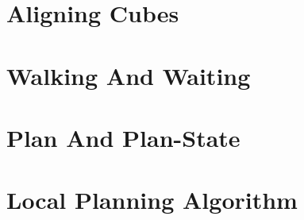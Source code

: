 \section{Aligning Cubes}
\label{sec:align}



\section{Walking And Waiting}
\label{sec:walk_wait}



\section{Plan And Plan-State}
\label{sec:plan}



\section{Local Planning Algorithm}
\label{sec:local_algo}